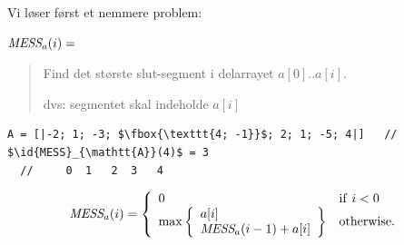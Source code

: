 \documentclass[rgb]{beamer}
\begin{document}
\begin{frame}[fragile]
\begin{footnotesize}

  \vspace{1ex}

  Vi løser først et nemmere problem:

  \vspace{1ex}

  $\mbox{\it{MESS}}_a(i) = $
  \begin{quote}
    Find det største slut-segment i delarrayet $a[0]..a[i]$.

    dvs: segmentet skal indeholde $a[i]$
  \end{quote}

  \vspace{1ex}

  \vspace{1ex}
\begin{lstlisting}[numbers=none,frame=none,mathescape]
  A = [|-2; 1; -3; $\fbox{\texttt{4; -1}}$; 2; 1; -5; 4|]   // $\id{MESS}_{\mathtt{A}}(4)$ = 3
  //     0  1   2  3   4
\end{lstlisting}
  \vspace{1ex}

  \vspace{1ex}

  \[
  \mbox{\it{MESS}}_a(i) = \left \{ \begin{array}{ll} 0 & \mathrm{if}~i < 0 \\
    \mathrm{max} \left \{ \begin{array}{l} a[i] \\
                                           \mbox{\it{MESS}}_a(i-1)+a[i]
                          \end{array} \right \} & \mathrm{otherwise}. \end{array} \right .
  \]


\end{footnotesize}
\end{frame}
\end{document}
